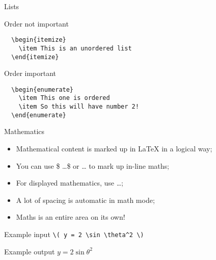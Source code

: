 \begin{frame}[fragile]{Lists}

  \begin{block}{Order not important}
\begin{verbatim}
  \begin{itemize}
    \item This is an unordered list
  \end{itemize}
\end{verbatim}
  \end{block}
  
  \begin{block}{Order important}
\begin{verbatim}
  \begin{enumerate}
    \item This one is ordered
    \item So this will have number 2!
  \end{enumerate}
\end{verbatim}
  \end{block}

\end{frame}

\begin{frame}[fragile]{Mathematics}

  \begin{itemize}
    \item Mathematical content is marked up in \LaTeX{} in a logical way;
    \item You can use \$ \ldots \$ or \cs{(} \ldots \cs{)} to mark up
      in-line maths;
    \item For displayed mathematics, use \cs{[} \ldots \cs{]};
    \item A lot of spacing is automatic in math mode;
    \item Maths is an entire area on its own!
  \end{itemize}
  
  \begin{block}{Example input}
    \verb"\( y = 2 \sin \theta^2 \)" 
  \end{block}
  
  \begin{block}{Example output}
    \( y = 2 \sin \theta^2 \)
  \end{block}

\end{frame}

